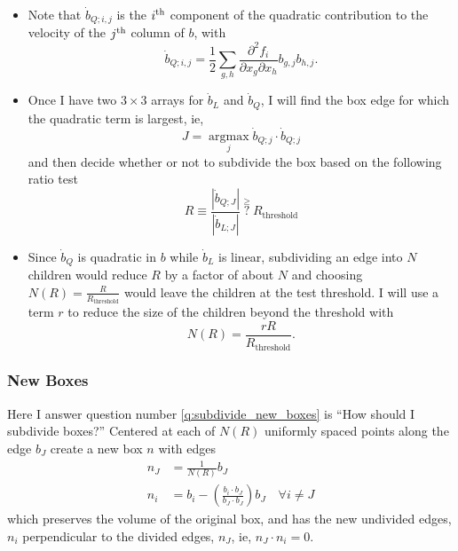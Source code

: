 \documentclass[12pt]{article}
\newcommand{\argmax}{\operatorname*{argmax}}
\begin{document}
\begin{itemize}
\item Note that $\dot b_{Q;i,j}$ is the $i^{\rm{th}}$ component of the
  quadratic contribution to the velocity of the $j^{\rm{th}}$ column
  of $b$, with
  \begin{equation}
    \label{eq:bdot_ij}
    \dot b_{Q;i,j} = \frac{1}{2} \sum_{g,h} \frac{\partial^2 f_i}{\partial x_g
      \partial x_h} b_{g,j} b_{h,j}.
  \end{equation}
\item Once I have two $3\times 3$ arrays for $\dot b_L$ and
  $\dot b_Q$, I will find the box edge for which the quadratic term is
  largest, ie,
  \begin{equation}
    \label{eq:J}
    J = \argmax_j \dot b_{Q;j}\cdot \dot b_{Q;j}
  \end{equation}
  and then decide whether or not to subdivide the box based on the following
  ratio test
  \begin{equation}
    \label{eq:LQ_ratio}
    R \equiv \frac{\left| \dot b_{Q;J} \right|}{\left| \dot b_{L;J}\right|}
                     ~\overset{\geq}{?}~ R_{\text{threshold}}
  \end{equation}
\item Since $\dot b_Q$ is quadratic in $b$ while $\dot b_L$ is linear,
  subdividing an edge into $N$ children would reduce $R$ by a factor
  of about $N$ and choosing $N(R) = \frac{R}{R_{\text{threshold}}}$
  would leave the children at the test threshold.  I will use a term
  $r$ to reduce the size of the children beyond the threshold with
  \begin{equation*}
    N(R) = \frac{rR}{R_{\text{threshold}}}.
  \end{equation*}
\end{itemize}

\subsubsection{New Boxes}
\label{sec:new_boxes}

Here I answer question number \ref{q:subdivide_new_boxes} is ``How
should I subdivide boxes?''  Centered at each of $N(R)$ uniformly
spaced points along the edge $b_J$ create a new box $n$ with edges
\begin{align*}
  n_J &= \frac{1}{N(R)} b_J \\
  n_i &= b_i - \left( \frac{b_i \cdot b_J}{b_J \cdot b_J} \right) b_J
        \quad \forall i \neq J
\end{align*}
which preserves the volume of the original box, and has the new
undivided edges, $n_i$ perpendicular to the divided edges, $n_J$, ie,
$n_J \cdot n_i = 0$.
\end{document}
